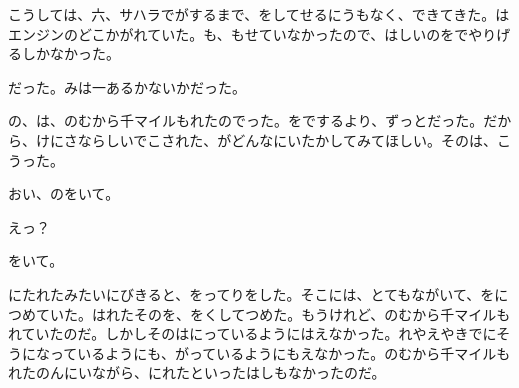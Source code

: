 こうしては、六、サハラでがするまで、をしてせるにうもなく、できてきた。はエンジンのどこかがれていた。も、もせていなかったので、はしいのをでやりげるしかなかった。

だった。みは一あるかないかだった。

の、は、のむから千マイルもれたのでった。をでするより、ずっとだった。だから、けにさならしいでこされた、がどんなにいたかしてみてほしい。そのは、こうった。

おい、のをいて。

えっ？

をいて。

にたれたみたいにびきると、をってりをした。そこには、とてもながいて、をにつめていた。はれたそのを、をくしてつめた。もうけれど、のむから千マイルもれていたのだ。しかしそのはにっているようにはえなかった。れやえやきでにそうになっているようにも、がっているようにもえなかった。のむから千マイルもれたのんにいながら、にれたといったはしもなかったのだ。

